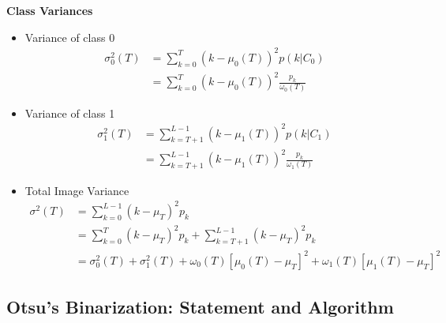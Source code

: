 \noindent \textbf{Class Variances}\\
\begin{itemize}
\item Variance of class 0
\begin{align*}
\sigma_0^2(T) &= \sum_{k=0}^{T} (k - \mu_0(T))^2 p(k | C_0)\\
&= \sum_{k=0}^{T} (k - \mu_0(T))^2 \frac{p_k}{\omega_0(T)}
\end{align*}

\item Variance of class 1
\begin{align*}
\sigma_1^2(T) &= \sum_{k=T+1}^{L-1} (k - \mu_1(T))^2 p(k | C_1)\\
&= \sum_{k=T+1}^{L-1} (k - \mu_1(T))^2 \frac{p_k}{\omega_1(T)}
\end{align*}

\item Total Image Variance
\begin{align*}
  \sigma^2 (T) &= \sum_{k=0}^{L-1} (k - \mu_T)^2 p_k \\
  &= \sum_{k=0}^{T} (k - \mu_T)^2 p_k + \sum_{k=T+1}^{L-1} (k - \mu_T)^2 p_k \\
  &= \sigma_0^2(T) + \sigma_1^2(T) + \omega_0(T)[\mu_0(T) - \mu_T]^2 + \omega_1(T)[\mu_1(T) - \mu_T]^2
\end{align*}
\end{itemize}

\subsection{Otsu’s Binarization: Statement and Algorithm}

